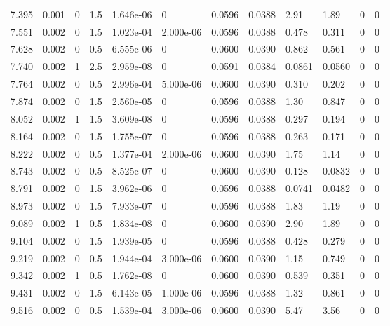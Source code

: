 \documentclass[preview]{standalone}
\begin{document}
{{{\begin{tabular}{L{1.2cm}C{1.2cm} C{0.3cm}C{0.5cm} C{1.4cm}C{1.4cm} C{1.4cm}C{1.4cm} C{1.6cm}C{1.6cm} C{1.6cm}C{1.6cm}}
  7.395  &  0.001  & 0     & 1.5 &  1.646e-06  & 0  &  0.0596&   0.0388& 2.91 & 1.89   &  0 & 0  \\ 
  7.551  &  0.002  & 0     & 1.5 &  1.023e-04  & 2.000e-06  &  0.0596&   0.0388& 0.478 & 0.311   &  0 & 0  \\ 
  7.628  &  0.002  & 0     & 0.5 &  6.555e-06  & 0  &  0.0600&   0.0390& 0.862 & 0.561   &  0 & 0  \\ 
  7.740  &  0.002  & 1     & 2.5 &  2.959e-08  & 0  &  0.0591&   0.0384& 0.0861 & 0.0560   &  0 & 0  \\ 
  7.764  &  0.002  & 0     & 0.5 &  2.996e-04  & 5.000e-06  &  0.0600&   0.0390& 0.310 & 0.202   &  0 & 0  \\ 
  7.874  &  0.002  & 0     & 1.5 &  2.560e-05  & 0  &  0.0596&   0.0388& 1.30 & 0.847   &  0 & 0  \\ 
  8.052  &  0.002  & 1     & 1.5 &  3.609e-08  & 0  &  0.0596&   0.0388& 0.297 & 0.194   &  0 & 0  \\ 
  8.164  &  0.002  & 0     & 1.5 &  1.755e-07  & 0  &  0.0596&   0.0388& 0.263 & 0.171   &  0 & 0  \\ 
  8.222  &  0.002  & 0     & 0.5 &  1.377e-04  & 2.000e-06  &  0.0600&   0.0390& 1.75 & 1.14   &  0 & 0  \\ 
  8.743  &  0.002  & 0     & 0.5 &  8.525e-07  & 0  &  0.0600&   0.0390& 0.128 & 0.0832   &  0 & 0  \\ 
  8.791  &  0.002  & 0     & 1.5 &  3.962e-06  & 0  &  0.0596&   0.0388& 0.0741 & 0.0482   &  0 & 0  \\ 
  8.973  &  0.002  & 0     & 1.5 &  7.933e-07  & 0  &  0.0596&   0.0388& 1.83 & 1.19   &  0 & 0  \\ 
  9.089  &  0.002  & 1     & 0.5 &  1.834e-08  & 0  &  0.0600&   0.0390& 2.90 & 1.89   &  0 & 0  \\ 
  9.104  &  0.002  & 0     & 1.5 &  1.939e-05  & 0  &  0.0596&   0.0388& 0.428 & 0.279   &  0 & 0  \\ 
  9.219  &  0.002  & 0     & 0.5 &  1.944e-04  & 3.000e-06  &  0.0600&   0.0390& 1.15 & 0.749   &  0 & 0  \\ 
  9.342  &  0.002  & 1     & 0.5 &  1.762e-08  & 0  &  0.0600&   0.0390& 0.539 & 0.351   &  0 & 0  \\ 
  9.431  &  0.002  & 0     & 1.5 &  6.143e-05  & 1.000e-06  &  0.0596&   0.0388& 1.32 & 0.861   &  0 & 0  \\ 
  9.516  &  0.002  & 0     & 0.5 &  1.539e-04  & 3.000e-06  &  0.0600&   0.0390& 5.47 & 3.56   &  0 & 0  \\ 

\end{tabular}}}}
\end{document}
